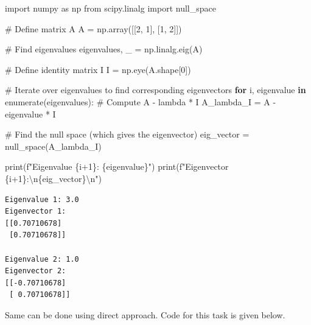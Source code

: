 \documentclass[
  letterpaper,
  DIV=11,
  numbers=noendperiod]{scrreprt}
\newenvironment{Shaded}{\begin{snugshade}}{\end{snugshade}}
\newcommand{\BuiltInTok}[1]{\textcolor[rgb]{0.00,0.23,0.31}{#1}}
\newcommand{\CharTok}[1]{\textcolor[rgb]{0.13,0.47,0.30}{#1}}
\newcommand{\CommentTok}[1]{\textcolor[rgb]{0.37,0.37,0.37}{#1}}
\newcommand{\ControlFlowTok}[1]{\textcolor[rgb]{0.00,0.23,0.31}{\textbf{#1}}}
\newcommand{\DecValTok}[1]{\textcolor[rgb]{0.68,0.00,0.00}{#1}}
\newcommand{\ImportTok}[1]{\textcolor[rgb]{0.00,0.46,0.62}{#1}}
\newcommand{\KeywordTok}[1]{\textcolor[rgb]{0.00,0.23,0.31}{\textbf{#1}}}
\newcommand{\NormalTok}[1]{\textcolor[rgb]{0.00,0.23,0.31}{#1}}
\newcommand{\OperatorTok}[1]{\textcolor[rgb]{0.37,0.37,0.37}{#1}}
\newcommand{\SpecialCharTok}[1]{\textcolor[rgb]{0.37,0.37,0.37}{#1}}
\newcommand{\SpecialStringTok}[1]{\textcolor[rgb]{0.13,0.47,0.30}{#1}}
\theoremstyle{plain}
\theoremstyle{definition}
\theoremstyle{remark}
\begin{document}
\begin{Shaded}
\begin{Highlighting}[]
\ImportTok{import}\NormalTok{ numpy }\ImportTok{as}\NormalTok{ np}
\ImportTok{from}\NormalTok{ scipy.linalg }\ImportTok{import}\NormalTok{ null\_space}

\CommentTok{\# Define matrix A}
\NormalTok{A }\OperatorTok{=}\NormalTok{ np.array([[}\DecValTok{2}\NormalTok{, }\DecValTok{1}\NormalTok{], }
\NormalTok{              [}\DecValTok{1}\NormalTok{, }\DecValTok{2}\NormalTok{]])}

\CommentTok{\# Find eigenvalues}
\NormalTok{eigenvalues, \_ }\OperatorTok{=}\NormalTok{ np.linalg.eig(A)}

\CommentTok{\# Define identity matrix I}
\NormalTok{I }\OperatorTok{=}\NormalTok{ np.eye(A.shape[}\DecValTok{0}\NormalTok{])}

\CommentTok{\# Iterate over eigenvalues to find corresponding eigenvectors}
\ControlFlowTok{for}\NormalTok{ i, eigenvalue }\KeywordTok{in} \BuiltInTok{enumerate}\NormalTok{(eigenvalues):}
    \CommentTok{\# Compute A {-} lambda * I}
\NormalTok{    A\_lambda\_I }\OperatorTok{=}\NormalTok{ A }\OperatorTok{{-}}\NormalTok{ eigenvalue }\OperatorTok{*}\NormalTok{ I}
    
    \CommentTok{\# Find the null space (which gives the eigenvector)}
\NormalTok{    eig\_vector }\OperatorTok{=}\NormalTok{ null\_space(A\_lambda\_I)}
    
    \BuiltInTok{print}\NormalTok{(}\SpecialStringTok{f"Eigenvalue }\SpecialCharTok{\{}\NormalTok{i}\OperatorTok{+}\DecValTok{1}\SpecialCharTok{\}}\SpecialStringTok{: }\SpecialCharTok{\{}\NormalTok{eigenvalue}\SpecialCharTok{\}}\SpecialStringTok{"}\NormalTok{)}
    \BuiltInTok{print}\NormalTok{(}\SpecialStringTok{f"Eigenvector }\SpecialCharTok{\{}\NormalTok{i}\OperatorTok{+}\DecValTok{1}\SpecialCharTok{\}}\SpecialStringTok{:}\CharTok{\textbackslash{}n}\SpecialCharTok{\{}\NormalTok{eig\_vector}\SpecialCharTok{\}}\CharTok{\textbackslash{}n}\SpecialStringTok{"}\NormalTok{)}
\end{Highlighting}
\end{Shaded}

\begin{verbatim}
Eigenvalue 1: 3.0
Eigenvector 1:
[[0.70710678]
 [0.70710678]]

Eigenvalue 2: 1.0
Eigenvector 2:
[[-0.70710678]
 [ 0.70710678]]
\end{verbatim}

Same can be done using direct approach. Code for this task is given
below.
\end{document}
